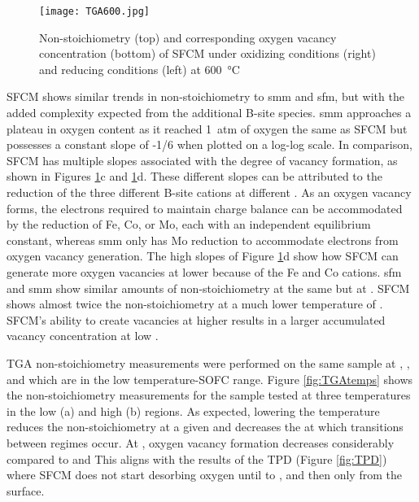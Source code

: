     \begin{figure}
      \texttt{[image: TGA600.jpg]}
      \caption{Non-stoichiometry (top) and corresponding oxygen vacancy concentration (bottom) of SFCM under oxidizing conditions (right) and reducing conditions (left) at \SI{600}{\celsius}}
      \label{fig:TGA600}
    \end{figure}

    SFCM shows similar trends in non-stoichiometry to \gls{smm} and \gls{sfm}, but with the added complexity expected from the additional B-site species.
    \gls{smm} approaches a plateau in oxygen content as it reached \SI{1}{atm} of oxygen the same as SFCM but possesses a constant slope of -1/6 when plotted on a log-log scale.\cite{Marrero-lopez2010}
    In comparison, SFCM has multiple slopes associated with the degree of vacancy formation, as shown in Figures \ref{fig:TGA600}c and \ref{fig:TGA600}d.
    These different slopes can be attributed to the reduction of the three different B-site cations at different .
    As an oxygen vacancy forms, the electrons required to maintain charge balance can be accommodated by the reduction of Fe, Co, or Mo, each with an independent equilibrium constant, whereas \gls{smm} only has Mo reduction to accommodate electrons from oxygen vacancy generation.
    The high slopes of Figure \ref{fig:TGA600}d show how SFCM can generate more oxygen vacancies at lower  because of the Fe and Co cations.
    \gls{sfm} and \gls{smm} show similar amounts of non-stoichiometry at the same  but at .\cite{Kircheisen2012}
    SFCM shows almost twice the non-stoichiometry at a much lower temperature of .
    SFCM's ability to create vacancies at higher  results in a larger accumulated vacancy concentration at low .

    TGA non-stoichiometry measurements were performed on the same sample at ,  , and  which are in the low temperature-SOFC range.
    Figure \ref{fig:TGAtemps} shows the non-stoichiometry measurements for the sample  tested at three temperatures in the low  (a) and high  (b) regions.
    As expected, lowering the temperature reduces the non-stoichiometry at a given  and decreases the  at which transitions between regimes occur.
    At , oxygen vacancy formation decreases considerably compared to  and 
    This aligns with the results of the TPD (Figure \ref{fig:TPD}) where SFCM does not start desorbing oxygen until  to , and then only from the surface.

